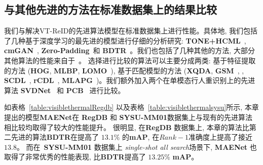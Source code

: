 \subsection{与其他先进的方法在标准数据集上的结果比较}
我们与解决VT-ReID的先进算法模型在标准数据集上进行性能。具体地, 我们包括了几种基于深度学习的最先进的模型进行仔细的分析研究: \textbf{TONE+HCML}~\cite{ye2018hierarchical}, \textbf{cmGAN}~\cite{dai2018cross}, \textbf{Zero-Padding}~\cite{wu2017rgb}和 \textbf{BDTR}~\cite{ye2019bi}。我们也包括了几种其他的方法, 大部分其他算法的性能来自于~\cite{ye2019bi}。 选择进行比较的算法可以主要分成两类: 基于特征提取的方法 (\textbf{HOG}, \textbf{MLBP}, \textbf{LOMO}~\cite{liao2015person}), 基于匹配模型的方法 (\textbf{XQDA}, \textbf{GSM}~\cite{lin2016cross}, , \textbf{SCDL}~\cite{wang2012semi}, \textbf{rCDL}~\cite{huang2013coupled}, \textbf{MLAPG}~\cite{liao2015efficient})。我们额外加入两个在单模态行人重识别上的先进算法 \textbf{SVDNet}~\cite{sun2017svdnet} 和 \textbf{PCB}~\cite{sun2018beyond} 进行比较。\par
如表格~\ref{table:visiblethermalRegdb} 以及表格~\ref{table:visiblethermalsysu}所示, 本章提出的模型\textbf{MAENet}在 \textbf{RegDB} 和 \textbf{SYSU-MM01}数据集上与现有的先进算法相比较均取得了较大的性能提升。 很明显, 在\textbf{RegDB} 数据集上, 本章的算法比第二先进的算法\textbf{BDTR}在提高了 $13.1 \%$
的\textbf{mAP}, 在$Rank-1$准确度上提高了接近$13.8$。 而在~\textbf{SYSU-MM01} 数据集上 \textit{single-shot all search}场景下, \textbf{MAENet} 也取得了非常优秀的性能表现, 比\textbf{BDTR}提高了 $13.25 \%$ \textbf{mAP}。

